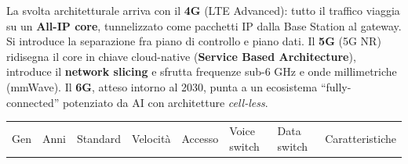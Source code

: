 \documentclass[
  italian,
  openany]{book}
\newcounter{none} %
\begin{document}
La svolta architetturale arriva con il \textbf{4G} (LTE Advanced): tutto
il traffico viaggia su un \textbf{All-IP core}, tunnelizzato come
pacchetti IP dalla Base Station al gateway. Si introduce la separazione
fra piano di controllo e piano dati. Il \textbf{5G} (5G NR) ridisegna il
core in chiave cloud-native (\textbf{Service Based Architecture}),
introduce il \textbf{network slicing} e sfrutta frequenze sub-6 GHz e
onde millimetriche (mmWave). Il \textbf{6G}, atteso intorno al 2030,
punta a un ecosistema ``fully-connected'' potenziato da AI con
architetture \emph{cell-less}.

{\def\LTcaptype{none} %
\begin{longtable}[]{@{}
  >{\raggedright\arraybackslash}p{}
  >{\raggedright\arraybackslash}p{}
  >{\raggedright\arraybackslash}p{}
  >{\raggedright\arraybackslash}p{}
  >{\raggedright\arraybackslash}p{}
  >{\raggedright\arraybackslash}p{}
  >{\raggedright\arraybackslash}p{}
  >{\raggedright\arraybackslash}p{}@{}}
\toprule\noalign{}
\begin{minipage}[b]{\linewidth}\raggedright
Gen
\end{minipage} & \begin{minipage}[b]{\linewidth}\raggedright
Anni
\end{minipage} & \begin{minipage}[b]{\linewidth}\raggedright
Standard
\end{minipage} & \begin{minipage}[b]{\linewidth}\raggedright
Velocità
\end{minipage} & \begin{minipage}[b]{\linewidth}\raggedright
Accesso
\end{minipage} & \begin{minipage}[b]{\linewidth}\raggedright
Voice switch
\end{minipage} & \begin{minipage}[b]{\linewidth}\raggedright
Data switch
\end{minipage} & \begin{minipage}[b]{\linewidth}\raggedright
Caratteristiche
\end{minipage} \\

\end{longtable}}
\end{document}
